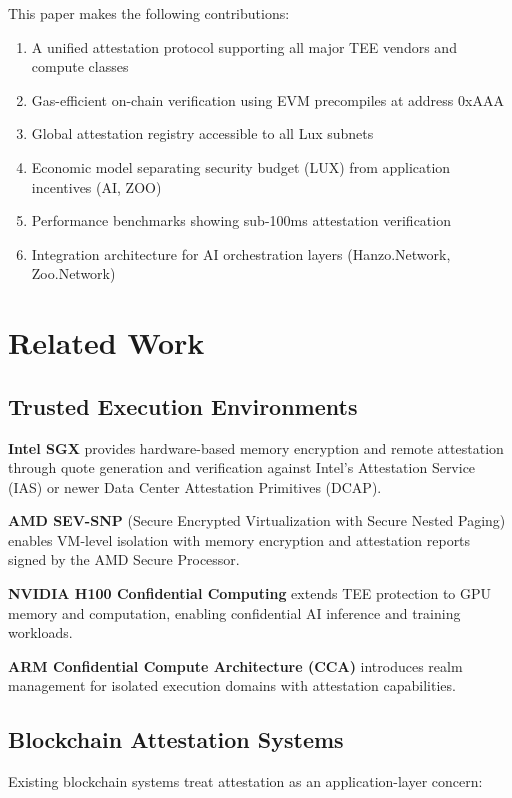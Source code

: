 \documentclass[11pt,a4paper]{article}
\begin{document}
This paper makes the following contributions:

\begin{enumerate}
\item A unified attestation protocol supporting all major TEE vendors and compute classes
\item Gas-efficient on-chain verification using EVM precompiles at address 0xAAA
\item Global attestation registry accessible to all Lux subnets
\item Economic model separating security budget (LUX) from application incentives (AI, ZOO)
\item Performance benchmarks showing sub-100ms attestation verification
\item Integration architecture for AI orchestration layers (Hanzo.Network, Zoo.Network)
\end{enumerate}

\section{Related Work}

\subsection{Trusted Execution Environments}

\textbf{Intel SGX} provides hardware-based memory encryption and remote attestation through quote generation and verification against Intel's Attestation Service (IAS) or newer Data Center Attestation Primitives (DCAP).

\textbf{AMD SEV-SNP} (Secure Encrypted Virtualization with Secure Nested Paging) enables VM-level isolation with memory encryption and attestation reports signed by the AMD Secure Processor.

\textbf{NVIDIA H100 Confidential Computing} extends TEE protection to GPU memory and computation, enabling confidential AI inference and training workloads.

\textbf{ARM Confidential Compute Architecture (CCA)} introduces realm management for isolated execution domains with attestation capabilities.

\subsection{Blockchain Attestation Systems}

Existing blockchain systems treat attestation as an application-layer concern:
\end{document}
